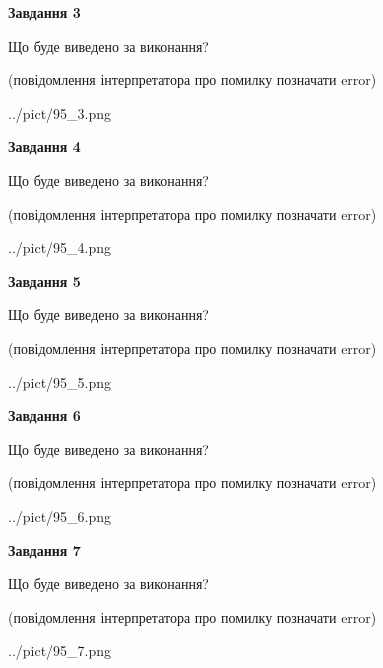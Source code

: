 \documentclass[12pt, ukrainian]{article}
\begin{document}
{\begin {large}
{\begin {center}\textbf{Завдання 3}\end {center}}\par
Що буде виведено за виконання?\par
 (повідомлення інтерпретатора про помилку позначати error)\par
\begin{center}
	{../pict/95_3.png}
\end{center}
\newpage

{\begin {center}\textbf{Завдання 4}\end {center}}\par
Що буде виведено за виконання?\par
 (повідомлення інтерпретатора про помилку позначати error)\par
\begin{center}
	{../pict/95_4.png}
\end{center}
\newpage

{\begin {center}\textbf{Завдання 5}\end {center}}\par
Що буде виведено за виконання?\par
 (повідомлення інтерпретатора про помилку позначати error)\par
\begin{center}
	{../pict/95_5.png}
\end{center}
\newpage

{\begin {center}\textbf{Завдання 6}\end {center}}\par
Що буде виведено за виконання?\par
 (повідомлення інтерпретатора про помилку позначати error)\par
\begin{center}
	{../pict/95_6.png}
\end{center}
\newpage

{\begin {center}\textbf{Завдання 7}\end {center}}\par
Що буде виведено за виконання?\par
 (повідомлення інтерпретатора про помилку позначати error)\par
\begin{center}
	{../pict/95_7.png}
\end{center}
\newpage


\end{large}}
\end{document}
